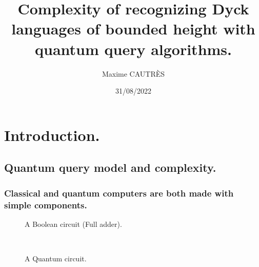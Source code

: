 \documentclass[9pt, notheorems]{beamer}
\title[QQC of bounded height Dyck languages.]{{\huge Complexity of recognizing Dyck languages
of bounded height with quantum query algorithms.}}
\author{Maxime CAUTRÈS}
\institute{Faculty of Computing\\ University of Latvia}
\date{31/08/2022}
\theoremstyle{definition}
\theoremstyle{plain}
\theoremstyle{definition}
\begin{document}
\begin{frame}
    \titlepage
\end{frame}

\section{Introduction.}


\subsection{Quantum query model and complexity.}

\begin{frame}
    \frametitle{Classical and quantum computers are both made with simple components.}
    \begin{minipage}{.45\textwidth}
        \begin{figure}
            
            \caption{A Boolean circuit (Full adder).}
        \end{figure}
    \end{minipage}
    \hfill
    \begin{minipage}{.45\textwidth}
        \begin{figure}
            \vspace*{.5cm}
            \\[.8cm]
            \caption{A Quantum circuit.}
        \end{figure}
    \end{minipage}
\end{frame}
\end{document}
